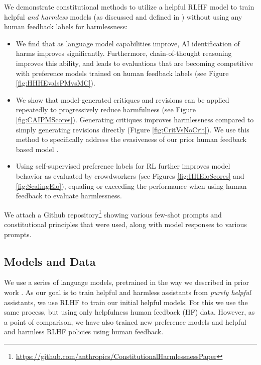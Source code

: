 \documentclass[english]{article}
\renewcommand\>{\rangle}
\begin{document}
We demonstrate constitutional methods to utilize a helpful RLHF model to train helpful {\it and harmless} models (as discussed and defined in \cite{askell2021general, bai2022training}) without using any human feedback labels for harmlessness:
\begin{itemize}
    \item We find that as language model capabilities improve, AI identification of harms improves significantly.  Furthermore,  chain-of-thought reasoning improves this ability, and leads to evaluations that are becoming competitive with preference models trained on human feedback labels (see Figure \ref{fig:HHHEvalsPMvsMC}).
    \item We show that model-generated critiques and revisions can be applied repeatedly to progressively reduce harmfulness (see Figure \ref{fig:CAIPMScores}). Generating critiques improves harmlessness compared to simply generating revisions directly (Figure \ref{fig:CritVsNoCrit}). We use this method to specifically address the evasiveness of our prior human feedback based model \cite{bai2022training}.
    \item Using  self-supervised preference labels for RL further improves model behavior as evaluated by crowdworkers (see Figures \ref{fig:HHEloScores} and \ref{fig:ScalingElo}), equaling or exceeding the performance when using human feedback to evaluate harmlessness.  
\end{itemize}
We attach a Github repository\footnote{\url{https://github.com/anthropics/ConstitutionalHarmlessnessPaper}} showing various few-shot prompts and constitutional principles that were used, along with model responses to various prompts. 




\subsection{Models and Data}

We use a series of language models, pretrained in the way we described in prior work \cite{bai2022training}.  As our goal is to train helpful and harmless assistants from {\it purely helpful} assistants, we use RLHF to train our initial helpful models. For this we use the same process, but using only helpfulness human feedback (HF) data.   However, as a point of comparison, we have also trained new preference models and helpful and harmless RLHF policies using human feedback.
\end{document}
